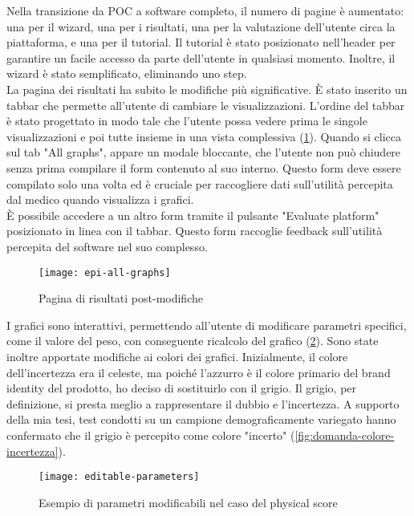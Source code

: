 Nella transizione da POC a software completo, il numero di pagine è aumentato: una per il wizard, una per i risultati, una per la valutazione dell'utente circa la piattaforma, e una per il tutorial. Il tutorial è stato posizionato nell'header per garantire un facile accesso da parte dell'utente in qualsiasi momento. Inoltre, il wizard è stato semplificato, eliminando uno step.\\
La pagina dei risultati ha subito le modifiche più significative. È stato inserito un tabbar che permette all'utente di cambiare le visualizzazioni. L'ordine del tabbar è stato progettato in modo tale che l'utente possa vedere prima le singole visualizzazioni e poi tutte insieme in una vista complessiva (\ref{fig:epi-all-graphs}). Quando si clicca sul tab "All graphs", appare un modale bloccante, che l'utente non può chiudere senza prima compilare il form contenuto al suo interno. Questo form deve essere compilato solo una volta ed è cruciale per raccogliere dati sull'utilità percepita dal medico quando visualizza i grafici.\\
È possibile accedere a un altro form tramite il pulsante "Evaluate platform" posizionato in linea con il tabbar. Questo form raccoglie feedback sull'utilità percepita del software nel suo complesso.\\

\begin{figure}[!ht] 
    \centering 
    \texttt{[image: epi-all-graphs]} 
    \caption{Pagina di risultati post-modifiche}
    \label{fig:epi-all-graphs}
\end{figure}

I grafici sono interattivi, permettendo all'utente di modificare parametri specifici, come il valore del peso, con conseguente ricalcolo del grafico (\ref{fig:editable-parameters}). Sono state inoltre apportate modifiche ai colori dei grafici. Inizialmente, il colore dell'incertezza era il celeste, ma poiché l'azzurro è il colore primario del brand identity del prodotto, ho deciso di sostituirlo con il grigio. Il grigio, per definizione, si presta meglio a rappresentare il dubbio e l'incertezza. A supporto della mia tesi, test condotti su un campione demograficamente variegato hanno confermato che il grigio è percepito come colore "incerto" (\ref{fig:domanda-colore-incertezza}).\\

\begin{figure}[!ht] 
    \centering 
    \texttt{[image: editable-parameters]} 
    \caption{Esempio di parametri modificabili nel caso del physical score}
    \label{fig:editable-parameters}
\end{figure}

